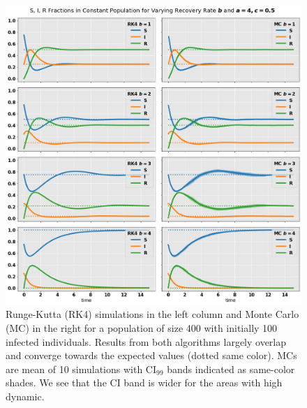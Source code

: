 \documentclass[]{article}
\begin{document}
\begin{figure}[!h]
	\centering
	\includegraphics[width=1\linewidth]{./figs/recovery-transmission-ratio.png}
	\caption{Runge-Kutta (RK4) simulations in the left column and Monte Carlo (MC) in the right for a population of size 400 with initially 100 infected individuals. Results from both algorithms largely overlap and converge towards the expected values (dotted same color). MCs are mean of 10 simulations with CI$_{99}$ bands indicated as same-color shades. We see that the CI band is wider for the areas with high dynamic.}
	\label{fig:recovery-transmission-ratio}
\end{figure}
\end{document}
